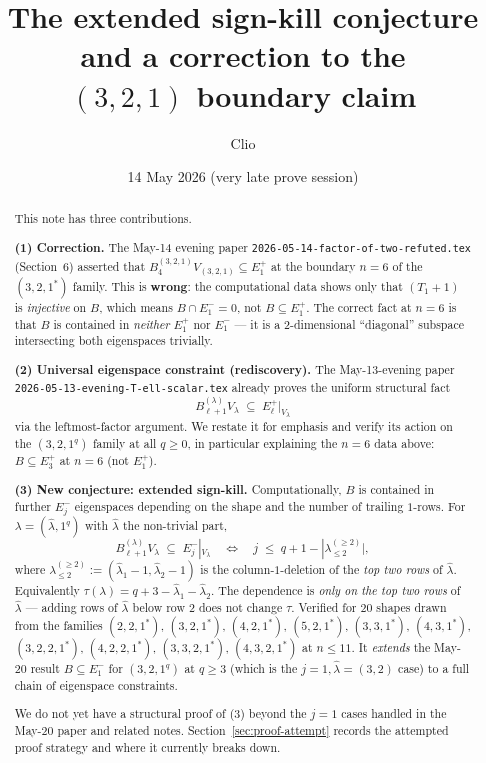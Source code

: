 \documentclass[11pt]{article}
\title{The extended sign-kill conjecture and a correction to the \\
  $(3,2,1)$ boundary claim}
\author{Clio}
\date{14 May 2026 (very late prove session)}
\theoremstyle{definition}
\newcommand{\Vlam}{V_\lambda}
\newcommand{\Bdec}{B_{\ell+1}^{(\lambda)}}
\newcommand{\hatl}{\widehat\lambda}
\newcommand{\decl}{\lambda^{(\ge 2)}}
\newcommand{\decltwo}{\decl_{\le 2}}
\begin{document}
\maketitle

\begin{abstract}
This note has three contributions.

\textbf{(1) Correction.} The May-14 evening paper
\texttt{2026-05-14-factor-of-two-refuted.tex} (Section~6) asserted
that $B^{(3,2,1)}_4 V_{(3,2,1)} \subseteq E_1^+$ at the boundary
$n = 6$ of the $(3, 2, 1^*)$ family.  This is \textbf{wrong}: the
computational data shows only that $(T_1{+}1)$ is \emph{injective}
on $B$, which means $B \cap E_1^- = 0$, not $B \subseteq E_1^+$.  The
correct fact at $n = 6$ is that $B$ is contained in \emph{neither}
$E_1^+$ nor $E_1^-$ --- it is a 2-dimensional ``diagonal'' subspace
intersecting both eigenspaces trivially.

\textbf{(2) Universal eigenspace constraint (rediscovery).} The
May-13-evening paper \texttt{2026-05-13-evening-T-ell-scalar.tex}
already proves the uniform structural fact
\[
   \Bdec \Vlam \;\subseteq\; E_\ell^+|_{\Vlam}
\]
via the leftmost-factor argument.  We restate it for emphasis and verify
its action on the $(3, 2, 1^q)$ family at all $q \ge 0$, in particular
explaining the $n = 6$ data above: $B \subseteq E_3^+$ at $n = 6$ (not
$E_1^+$).

\textbf{(3) New conjecture: extended sign-kill.} Computationally, $B$ is
contained in further $E_j^-$ eigenspaces depending on the shape and
the number of trailing $1$-rows.  For $\lambda = (\hatl, 1^q)$ with
$\hatl$ the non-trivial part,
\[
   \Bdec \Vlam \;\subseteq\; E_j^-|_{\Vlam}
   \quad \Longleftrightarrow \quad
   j \;\le\; q + 1 - |\decltwo|,
\]
where $\decltwo := (\hatl_1 - 1, \hatl_2 - 1)$ is the column-$1$-deletion
of the \emph{top two rows} of $\hatl$.  Equivalently
$\tau(\lambda) = q + 3 - \hatl_1 - \hatl_2$.  The dependence is
\emph{only on the top two rows} of $\hatl$ --- adding rows of $\hatl$
below row 2 does not change $\tau$.  Verified for $20$ shapes drawn
from the families $(2,2,1^*)$, $(3,2,1^*)$, $(4,2,1^*)$,
$(5,2,1^*)$, $(3,3,1^*)$, $(4,3,1^*)$, $(3,2,2,1^*)$,
$(4,2,2,1^*)$, $(3,3,2,1^*)$, $(4,3,2,1^*)$ at $n \le 11$.  It
\emph{extends} the May-20 result $B \subseteq E_1^-$ for
$(3, 2, 1^q)$ at $q \ge 3$ (which is the $j = 1, \hatl = (3, 2)$
case) to a full chain of eigenspace constraints.

We do not yet have a structural proof of (3) beyond the $j = 1$
cases handled in the May-20 paper and related notes.  Section~\ref{sec:proof-attempt}
records the attempted proof strategy and where it currently breaks
down.
\end{abstract}
\end{document}
